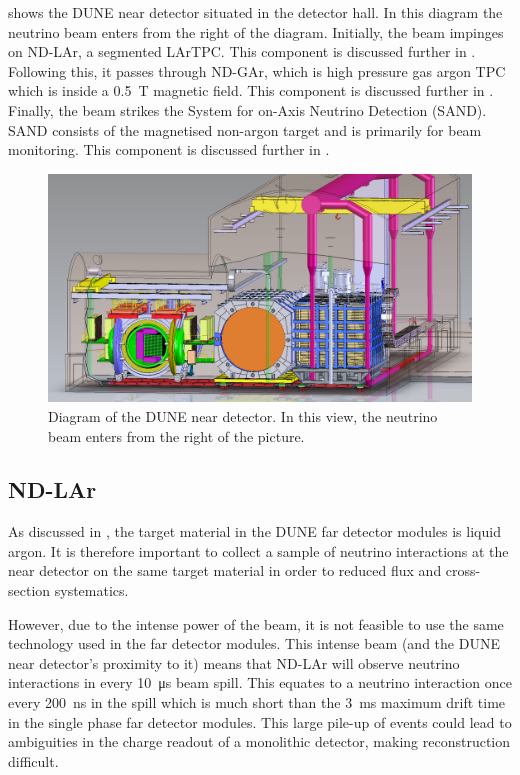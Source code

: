  shows the DUNE near detector situated in the detector hall.
In this diagram the neutrino beam enters from the right of the diagram.
Initially, the beam impinges on ND-LAr, a segmented LArTPC. This component is discussed further in .
Following this, it passes through ND-GAr, which is high pressure gas argon TPC which is inside a \SI{0.5}{\tesla} magnetic field. This component is discussed further in .
Finally, the beam strikes the System for on-Axis Neutrino Detection (SAND).
SAND consists of the magnetised non-argon target and is primarily for beam monitoring.
This component is discussed further in .

\begin{figure}[h]
  \centering
  \includegraphics[width=.7\linewidth]{files/figures/dune_detector/ndDiag}
  \caption[Diagram of the DUNE near detector.]{Diagram of the DUNE near detector. In this view, the neutrino beam enters from the right of the picture.}
  \label{fig:ndDiag}
\end{figure}

\subsection{ND-LAr}
\label{sec:dune:nd:lar}
As discussed in , the target material in the DUNE far detector modules is liquid argon.
It is therefore important to collect a sample of neutrino interactions at the near detector on the same target material in order to reduced flux and cross-section systematics.

However, due to the intense power of the beam, it is not feasible to use the same technology used in the far detector modules.
This intense beam (and the DUNE near detector's proximity to it) means that ND-LAr will observe  neutrino interactions in every \SI{10}{\micro\second} beam spill.
This equates to a neutrino interaction once every \SI{200}{\nano\second} in the spill which is much short than the \SI{3}{\milli\second} maximum drift time in the single phase far detector modules.
This large pile-up of events could lead to ambiguities in the charge readout of a monolithic detector, making reconstruction difficult.

